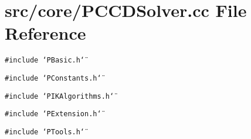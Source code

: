 \section{src/core/PCCDSolver.cc File Reference}
\label{PCCDSolver_8cc}


{\tt \#include \char`\"{}PBasic.h\char`\"{}}\par
{\tt \#include \char`\"{}PConstants.h\char`\"{}}\par
{\tt \#include \char`\"{}PIKAlgorithms.h\char`\"{}}\par
{\tt \#include \char`\"{}PExtension.h\char`\"{}}\par
{\tt \#include \char`\"{}PTools.h\char`\"{}}\par
